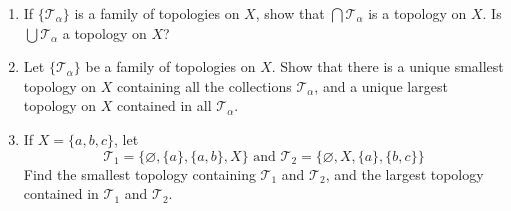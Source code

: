 \documentclass{article}
\begin{document}
\begin{problem}
\begin{enumerate}[label=\alph*)]
  \item If $\{\mathscr{T}_\alpha\}$ is a family of topologies on $X$, show that $\bigcap \mathscr{T}_\alpha$ is a topology on $X$. Is $\bigcup \mathscr{T}_\alpha$ a topology on $X$?
  \item Let $\{\mathscr{T}_\alpha\}$ be a family of topologies on $X$. Show that there is a unique smallest topology on $X$ containing all the collections $\mathscr{T}_\alpha$, and a unique largest topology on $X$ contained in all $\mathscr{T}_\alpha$.
  \item If $X = \{a, b, c\}$, let
        $$\mathscr{T}_1 = \{\varnothing, \{a\}, \{a, b\}, X\} \text{ and } \mathscr{T}_2 = \{\varnothing, X, \{a\}, \{b, c\}\}$$
        Find the smallest topology containing $\mathscr{T}_1$ and $\mathscr{T}_2$, and the largest topology contained in $\mathscr{T}_1$ and $\mathscr{T}_2$.
\end{enumerate}

\end{problem}
\end{document}
